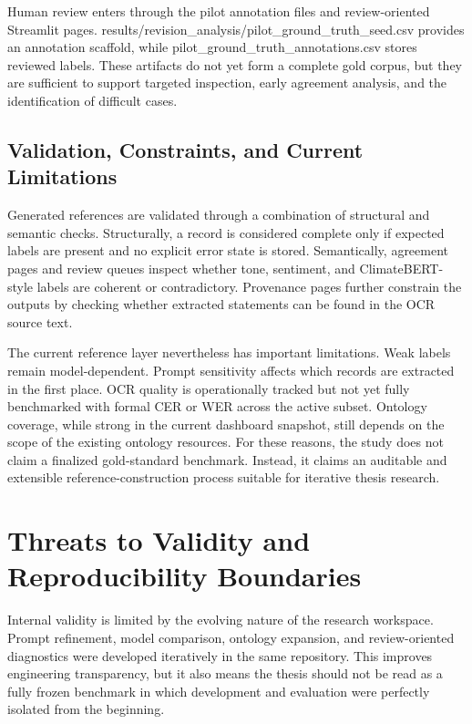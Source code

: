 Human review enters through the pilot annotation files and review-oriented Streamlit pages. results/revision\_analysis/pilot\_ground\_truth\_seed.csv provides an annotation scaffold, while pilot\_ground\_truth\_annotations.csv stores reviewed labels. These artifacts do not yet form a complete gold corpus, but they are sufficient to support targeted inspection, early agreement analysis, and the identification of difficult cases.

\subsection{Validation, Constraints, and Current Limitations}

Generated references are validated through a combination of structural and semantic checks. Structurally, a record is considered complete only if expected labels are present and no explicit error state is stored. Semantically, agreement pages and review queues inspect whether tone, sentiment, and ClimateBERT-style labels are coherent or contradictory. Provenance pages further constrain the outputs by checking whether extracted statements can be found in the OCR source text.

The current reference layer nevertheless has important limitations. Weak labels remain model-dependent. Prompt sensitivity affects which records are extracted in the first place. OCR quality is operationally tracked but not yet fully benchmarked with formal CER or WER across the active subset. Ontology coverage, while strong in the current dashboard snapshot, still depends on the scope of the existing ontology resources. For these reasons, the study does not claim a finalized gold-standard benchmark. Instead, it claims an auditable and extensible reference-construction process suitable for iterative thesis research.

\section{Threats to Validity and Reproducibility Boundaries}

Internal validity is limited by the evolving nature of the research workspace. Prompt refinement, model comparison, ontology expansion, and review-oriented diagnostics were developed iteratively in the same repository. This improves engineering transparency, but it also means the thesis should not be read as a fully frozen benchmark in which development and evaluation were perfectly isolated from the beginning.

